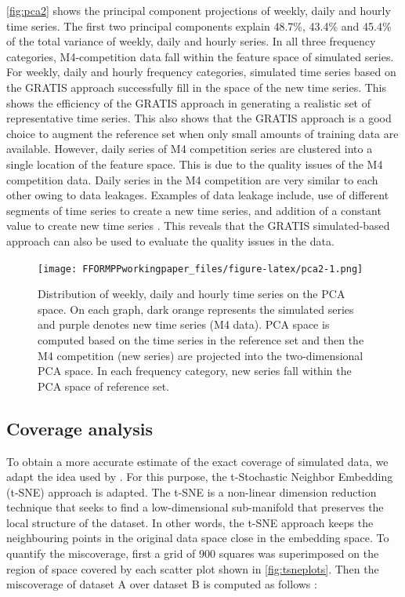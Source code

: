 \documentclass[11pt,a4paper,]{article}
\begin{document}
\autoref{fig:pca2} shows the principal component projections of weekly, daily and hourly time series. The first two principal components explain 48.7\%, 43.4\% and 45.4\% of the total variance of weekly, daily and hourly series. In all three frequency categories, M4-competition data fall within the feature space of simulated series. For weekly, daily and hourly frequency categories, simulated time series based on the GRATIS approach successfully fill in the space of the new time series. This shows the efficiency of the GRATIS approach in generating a realistic set of representative time series. This also shows that the GRATIS approach is a good choice to augment the reference set when only small amounts of training data are available. However, daily series of M4 competition series are clustered into a single location of the feature space. This is due to the quality issues of the M4 competition data. Daily series in the M4 competition are very similar to each other owing to data leakages. Examples of data leakage include, use of different segments of time series to create a new time series, and addition of a constant value to create new time series \autocite{ingel2019correlated}. This reveals that the GRATIS simulated-based approach can also be used to evaluate the quality issues in the data.

\begin{figure}
\centering
\texttt{[image: FFORMPPworkingpaper\_files/figure-latex/pca2-1.png]}
\caption{\label{fig:pca2}Distribution of weekly, daily and hourly time series on the PCA space. On each graph, dark orange represents the simulated series and purple denotes new time series (M4 data). PCA space is computed based on the time series in the reference set and then the M4 competition (new series) are projected into the two-dimensional PCA space. In each frequency category, new series fall within the PCA space of reference set.}
\end{figure}

\hypertarget{coverage-analysis}{%
\subsection{Coverage analysis}\label{coverage-analysis}}

To obtain a more accurate estimate of the exact coverage of simulated data, we adapt the idea used by \textcite{kang2019gratis}. For this purpose, the t-Stochastic Neighbor Embedding (t-SNE) approach is adapted. The t-SNE is a non-linear dimension reduction technique that seeks to find a low-dimensional sub-manifold that preserves the local structure of the dataset. In other words, the t-SNE approach keeps the neighbouring points in the original data space close in the embedding space. To quantify the miscoverage, first a grid of 900 squares was superimposed on the region of space covered by each scatter plot shown in \autoref{fig:tsneplots}. Then the miscoverage of dataset A over dataset B is computed as follows \autocite{kang2019gratis}:
\end{document}
